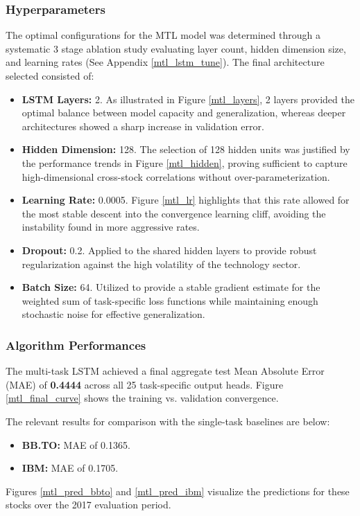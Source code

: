 \documentclass[conference]{IEEEtran}
\begin{document}
\subsubsection*{Hyperparameters}
The optimal configurations for the MTL model was determined through a systematic 3 stage ablation study 
evaluating layer count, hidden dimension size, and learning rates (See Appendix \ref{mtl_lstm_tune}). The final architecture selected consisted of:
\begin{itemize}
    \item \textbf{LSTM Layers:} 2. As illustrated in Figure \ref{mtl_layers}, 2 layers provided the optimal balance between model capacity and generalization, whereas deeper architectures showed a sharp increase in validation error.
    \item \textbf{Hidden Dimension:} 128. The selection of 128 hidden units was justified by the performance trends in Figure \ref{mtl_hidden}, proving sufficient to capture high-dimensional cross-stock correlations without over-parameterization.
    \item \textbf{Learning Rate:} 0.0005. Figure \ref{mtl_lr} highlights that this rate allowed for the most stable descent into the convergence learning cliff, avoiding the instability found in more aggressive rates.
    \item \textbf{Dropout:} 0.2. Applied to the shared hidden layers to provide robust regularization against the high volatility of the technology sector.
    \item \textbf{Batch Size:} 64. Utilized to provide a stable gradient estimate for the weighted sum of task-specific loss functions while maintaining enough stochastic noise for effective generalization.
\end{itemize}

\subsubsection*{Algorithm Performances}
The multi-task LSTM achieved a final aggregate test Mean Absolute Error (MAE) of \textbf{0.4444} across all 25 task-specific output heads. 
Figure \ref{mtl_final_curve} shows the training vs. validation convergence.

The relevant results for comparison with the single-task baselines are below:
\begin{itemize}
    \item \textbf{BB.TO:} MAE of 0.1365.
    \item \textbf{IBM:} MAE of 0.1705.
\end{itemize}
Figures \ref{mtl_pred_bbto} and \ref{mtl_pred_ibm} visualize the predictions for these stocks over the 2017 evaluation period.
\end{document}
